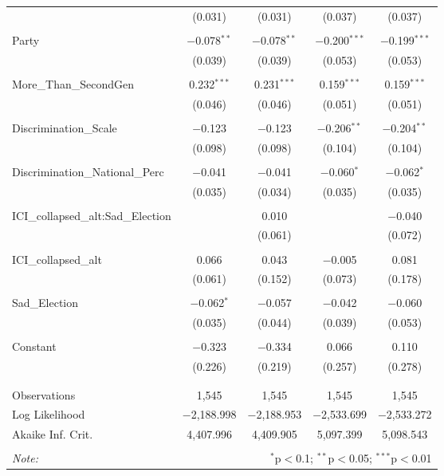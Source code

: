 \begin{table}[!htbp]
\begin{tabular}{@{\extracolsep{5pt}}lcccc}
  & (0.031) & (0.031) & (0.037) & (0.037) \\ 
  & & & & \\ 
 Party & $-$0.078$^{**}$ & $-$0.078$^{**}$ & $-$0.200$^{***}$ & $-$0.199$^{***}$ \\ 
  & (0.039) & (0.039) & (0.053) & (0.053) \\ 
  & & & & \\ 
 More\_Than\_SecondGen & 0.232$^{***}$ & 0.231$^{***}$ & 0.159$^{***}$ & 0.159$^{***}$ \\ 
  & (0.046) & (0.046) & (0.051) & (0.051) \\ 
  & & & & \\ 
 Discrimination\_Scale & $-$0.123 & $-$0.123 & $-$0.206$^{**}$ & $-$0.204$^{**}$ \\ 
  & (0.098) & (0.098) & (0.104) & (0.104) \\ 
  & & & & \\ 
 Discrimination\_National\_Perc & $-$0.041 & $-$0.041 & $-$0.060$^{*}$ & $-$0.062$^{*}$ \\ 
  & (0.035) & (0.034) & (0.035) & (0.035) \\ 
  & & & & \\ 
 ICI\_collapsed\_alt:Sad\_Election &  & 0.010 &  & $-$0.040 \\ 
  &  & (0.061) &  & (0.072) \\ 
  & & & & \\ 
 ICI\_collapsed\_alt & 0.066 & 0.043 & $-$0.005 & 0.081 \\ 
  & (0.061) & (0.152) & (0.073) & (0.178) \\ 
  & & & & \\ 
 Sad\_Election & $-$0.062$^{*}$ & $-$0.057 & $-$0.042 & $-$0.060 \\ 
  & (0.035) & (0.044) & (0.039) & (0.053) \\ 
  & & & & \\ 
 Constant & $-$0.323 & $-$0.334 & 0.066 & 0.110 \\ 
  & (0.226) & (0.219) & (0.257) & (0.278) \\ 
  & & & & \\ 
\hline \\[-1.8ex] 
Observations & 1,545 & 1,545 & 1,545 & 1,545 \\ 
Log Likelihood & $-$2,188.998 & $-$2,188.953 & $-$2,533.699 & $-$2,533.272 \\ 
Akaike Inf. Crit. & 4,407.996 & 4,409.905 & 5,097.399 & 5,098.543 \\ 
\hline 
\hline \\[-1.8ex] 
\textit{Note:}  & \multicolumn{4}{r}{$^{*}$p$<$0.1; $^{**}$p$<$0.05; $^{***}$p$<$0.01} \\ 
\end{tabular} 
\end{table} 
